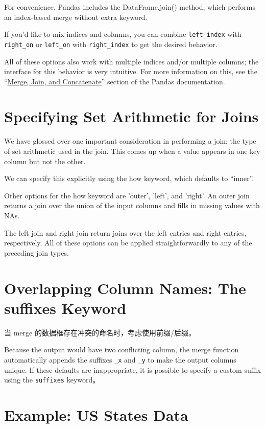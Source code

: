 For convenience, Pandas includes the DataFrame.join() method, which performs an
index-based merge without extra keyword.

If you'd like to mix indices and columns, you can combine \verb|left_index| with \verb|right_on|
or \verb|left_on| with \verb|right_index| to get the desired behavior.

All of these options also work with multiple indices and/or multiple columns; the
interface for this behavior is very intuitive. For more information on this, see the
``\href{http://pandas.pydata.org/pandas-docs/stable/user_guide/merging.html}{Merge, Join, and Concatenate}'' section of the Pandas documentation.
\section{Specifying Set Arithmetic for Joins}

We have glossed over one important consideration in
performing a join: the type of set arithmetic used in the join. This comes up when a
value appears in one key column but not the other.


We can specify this explicitly using the how keyword,
which defaults to ``inner''.

Other options for the how keyword are 'outer', 'left', and 'right'. An outer join
returns a join over the union of the input columns and fills in missing values with NAs.

The left join and right join return joins over the left entries and right entries, respectively. All of these options can be applied straightforwardly to any of the preceding join
types.
\section{Overlapping Column Names: The suffixes Keyword}
当 merge 的数据框存在冲突的命名时，考虑使用前缀/后缀。

Because the output would have two conflicting column, the merge function
automatically appends the suffixes \verb|_x| and \verb|_y| to make the output columns unique. If
these defaults are inappropriate, it is possible to specify a custom suffix using the \verb|suffixes| keyword。

\section{Example: US States Data}